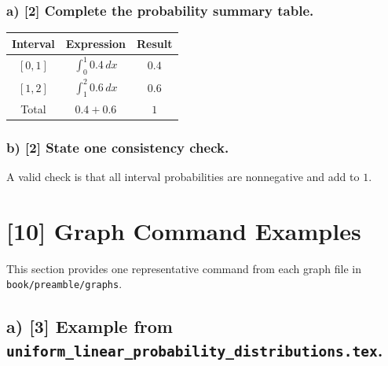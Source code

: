\subsubsection*{a) [2] Complete the probability summary table.}
\label{subsec:example-table-and-probability-summary-c3-a}
\begin{center}
\begin{tabular}{|c|c|c|}
\hline
Interval & Expression & Result \\
\hline
$[0,1]$ & $\int_0^1 0.4\,dx$ & $0.4$ \\
$[1,2]$ & $\int_1^2 0.6\,dx$ & $0.6$ \\
\hline
Total & $0.4+0.6$ & $1$ \\
\hline
\end{tabular}
\end{center}



\subsubsection*{b) [2] State one consistency check.}
\label{subsec:example-table-and-probability-summary-c3-b}
A valid check is that all interval probabilities are nonnegative and add to $1$.


\section{[10] Graph Command Examples}
\label{sec:graph-command-examples}
This section provides one representative command from each graph file in \texttt{book/preamble/graphs}.


\subsection{a) [3] Example from \texttt{uniform\_linear\_probability\_distributions.tex}.}
\label{subsec:graph-command-examples-a}

